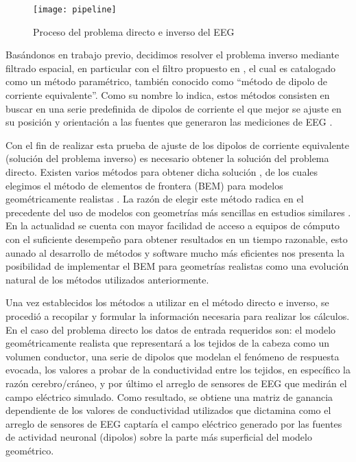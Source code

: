\begin{figure}[tbp]
	\centering
	\texttt{[image: pipeline]}
	\caption{Proceso del problema directo e inverso del EEG
		}
	\label{fig:methodology:pipeline}
\end{figure}

Basándonos en trabajo previo, decidimos resolver el problema inverso mediante filtrado espacial, en particular con el filtro propuesto en \cite{VanVeen1988}, el cual es catalogado como un método paramétrico, también conocido como ``método de dipolo de corriente equivalente''.
Como su nombre lo indica, estos métodos consisten en buscar en una serie predefinida de dipolos de corriente el que mejor se ajuste en su posición y orientación a las fuentes que generaron las mediciones de EEG  \cite{Hallez2007}.

Con el fin de realizar esta prueba de ajuste de los dipolos de corriente equivalente (solución del problema inverso) es necesario obtener la solución del problema directo. Existen varios métodos para obtener dicha solución \cite{Mosher1999}, de los cuales elegimos el método de elementos de frontera (BEM) para modelos geométricamente realistas \cite{Ermer2001}.
La razón de elegir este método radica en el precedente del uso de modelos con geometrías más sencillas en estudios similares \cite{Gutierrez2004}.
En la actualidad se cuenta con mayor facilidad de acceso a equipos de cómputo con el suficiente desempeño para obtener resultados en un tiempo razonable, esto aunado al desarrollo de métodos y software mucho más eficientes \cite{open,Clerc2010} nos presenta la posibilidad de implementar el BEM para geometrías realistas como una evolución natural de los métodos utilizados anteriormente.

Una vez establecidos los métodos a utilizar en el método directo e inverso, se procedió a recopilar y formular la información necesaria para realizar los cálculos.
En el caso del problema directo los datos de entrada requeridos son: el modelo geométricamente realista que representará a los tejidos de la cabeza como un volumen conductor, una serie de dipolos que modelan el fenómeno de respuesta evocada, los valores a probar de la conductividad entre los tejidos, en específico la razón cerebro/cráneo, y por último el arreglo de sensores de EEG que medirán el campo eléctrico simulado.
Como resultado, se obtiene una matriz de ganancia dependiente de los valores de conductividad utilizados que dictamina como el arreglo de sensores de EEG captaría el campo eléctrico generado por las fuentes de actividad neuronal (dipolos) sobre la parte más superficial del modelo geométrico.

